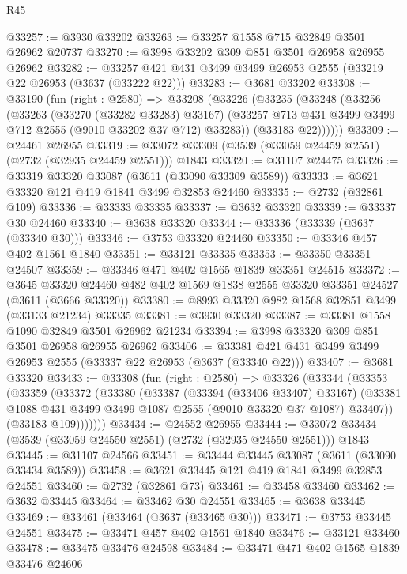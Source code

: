 \begin{lexlean}{R45}
\begin{coremodule}
@33257 := @3930 @33202
@33263 := @33257 @1558 @715 @32849 @3501 @26962 @20737
@33270 := @3998 @33202 @309 @851 @3501 @26958 @26955 @26962
@33282 := @33257 @421 @431 @3499 @3499 @26953 @2555 (@33219 @22 @26953 (@3637 (@33222 @22)))
@33283 := @3681 @33202
@33308 := @33190
    (fun (right : @2580) =>
    @33208
      (@33226
        (@33235
          (@33248
            (@33256
              (@33263
                (@33270 (@33282 @33283) @33167)
                (@33257 @713 @431 @3499 @3499 @712 @2555 (@9010 @33202 @37 @712) @33283))
              (@33183 @22))))))
@33309 := @24461 @26955
@33319 := @33072 @33309 (@3539 (@33059 @24459 @2551) (@2732 (@32935 @24459 @2551))) @1843
@33320 := @31107 @24475
@33326 := @33319 @33320 @33087 (@3611 (@33090 @33309 @3589))
@33333 := @3621 @33320 @121 @419 @1841 @3499 @32853 @24460
@33335 := @2732 (@32861 @109)
@33336 := @33333 @33335
@33337 := @3632 @33320
@33339 := @33337 @30 @24460
@33340 := @3638 @33320
@33344 := @33336 (@33339 (@3637 (@33340 @30)))
@33346 := @3753 @33320 @24460
@33350 := @33346 @457 @402 @1561 @1840
@33351 := @33121 @33335
@33353 := @33350 @33351 @24507
@33359 := @33346 @471 @402 @1565 @1839 @33351 @24515
@33372 := @3645
    @33320
    @24460
    @482
    @402
    @1569
    @1838
    @2555
    @33320
    @33351
    @24527
    (@3611 (@3666 @33320))
@33380 := @8993 @33320 @982 @1568 @32851 @3499 (@33133 @21234) @33335
@33381 := @3930 @33320
@33387 := @33381 @1558 @1090 @32849 @3501 @26962 @21234
@33394 := @3998 @33320 @309 @851 @3501 @26958 @26955 @26962
@33406 := @33381 @421 @431 @3499 @3499 @26953 @2555 (@33337 @22 @26953 (@3637 (@33340 @22)))
@33407 := @3681 @33320
@33433 := @33308
    (fun (right : @2580) =>
    @33326
      (@33344
        (@33353
          (@33359
            (@33372
              (@33380
                (@33387
                  (@33394 (@33406 @33407) @33167)
                  (@33381 @1088 @431 @3499 @3499 @1087 @2555 (@9010 @33320 @37 @1087) @33407))
                (@33183 @109)))))))
@33434 := @24552 @26955
@33444 := @33072 @33434 (@3539 (@33059 @24550 @2551) (@2732 (@32935 @24550 @2551))) @1843
@33445 := @31107 @24566
@33451 := @33444 @33445 @33087 (@3611 (@33090 @33434 @3589))
@33458 := @3621 @33445 @121 @419 @1841 @3499 @32853 @24551
@33460 := @2732 (@32861 @73)
@33461 := @33458 @33460
@33462 := @3632 @33445
@33464 := @33462 @30 @24551
@33465 := @3638 @33445
@33469 := @33461 (@33464 (@3637 (@33465 @30)))
@33471 := @3753 @33445 @24551
@33475 := @33471 @457 @402 @1561 @1840
@33476 := @33121 @33460
@33478 := @33475 @33476 @24598
@33484 := @33471 @471 @402 @1565 @1839 @33476 @24606

\end{coremodule}
\end{lexlean}
